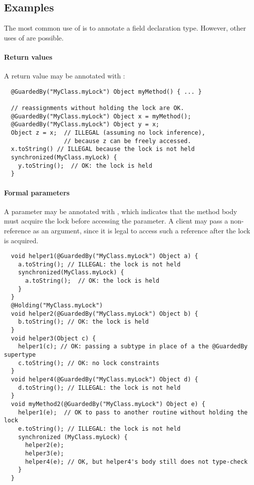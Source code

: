 \subsection{Examples}

The most common use of  is to annotate a field declaration
type.  However, other uses of  are possible.

\paragraph{Return values}

A return value may be annotated with :

\begin{Verbatim}
  @GuardedBy("MyClass.myLock") Object myMethod() { ... }

  // reassignments without holding the lock are OK.
  @GuardedBy("MyClass.myLock") Object x = myMethod();
  @GuardedBy("MyClass.myLock") Object y = x;
  Object z = x;  // ILLEGAL (assuming no lock inference),
                 // because z can be freely accessed.
  x.toString() // ILLEGAL because the lock is not held
  synchronized(MyClass.myLock) {
    y.toString();  // OK: the lock is held
  }
\end{Verbatim}

\paragraph{Formal parameters}

A parameter may be annotated with , which indicates that
the method body must acquire the lock before accessing the parameter.  A
client may pass a non- reference as an argument, since it
is legal to access such a reference after the lock is acquired.

\begin{Verbatim}
  void helper1(@GuardedBy("MyClass.myLock") Object a) {
    a.toString(); // ILLEGAL: the lock is not held
    synchronized(MyClass.myLock) {
      a.toString();  // OK: the lock is held
    }
  }
  @Holding("MyClass.myLock")
  void helper2(@GuardedBy("MyClass.myLock") Object b) {
    b.toString(); // OK: the lock is held
  }
  void helper3(Object c) {
    helper1(c); // OK: passing a subtype in place of a the @GuardedBy supertype
    c.toString(); // OK: no lock constraints
  }
  void helper4(@GuardedBy("MyClass.myLock") Object d) {
    d.toString(); // ILLEGAL: the lock is not held
  }
  void myMethod2(@GuardedBy("MyClass.myLock") Object e) {
    helper1(e);  // OK to pass to another routine without holding the lock
    e.toString(); // ILLEGAL: the lock is not held
    synchronized (MyClass.myLock) {
      helper2(e);
      helper3(e);
      helper4(e); // OK, but helper4's body still does not type-check
    }
  }
\end{Verbatim}


